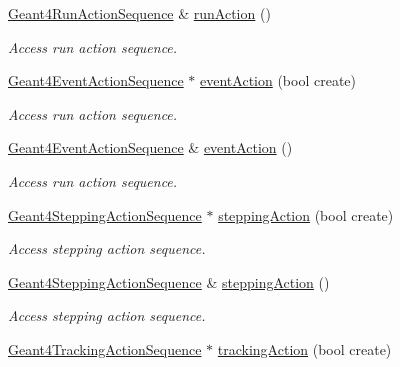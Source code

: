 \begin{DoxyCompactItemize}
\hyperlink{class_d_d4hep_1_1_simulation_1_1_geant4_run_action_sequence}{Geant4\+Run\+Action\+Sequence} \& \hyperlink{class_d_d4hep_1_1_simulation_1_1_geant4_action_container_adff65baf436f870b8cc2e9ffd8844e7a}{run\+Action} ()
\begin{DoxyCompactList}\small\item\em Access run action sequence. \end{DoxyCompactList}\item 
\hyperlink{class_d_d4hep_1_1_simulation_1_1_geant4_event_action_sequence}{Geant4\+Event\+Action\+Sequence} $\ast$ \hyperlink{class_d_d4hep_1_1_simulation_1_1_geant4_action_container_ab195f38387e12afbfcaccee77ec67845}{event\+Action} (bool create)
\begin{DoxyCompactList}\small\item\em Access run action sequence. \end{DoxyCompactList}\item 
\hyperlink{class_d_d4hep_1_1_simulation_1_1_geant4_event_action_sequence}{Geant4\+Event\+Action\+Sequence} \& \hyperlink{class_d_d4hep_1_1_simulation_1_1_geant4_action_container_a50aa73045e0959041a1ae5c162ab840d}{event\+Action} ()
\begin{DoxyCompactList}\small\item\em Access run action sequence. \end{DoxyCompactList}\item 
\hyperlink{class_d_d4hep_1_1_simulation_1_1_geant4_stepping_action_sequence}{Geant4\+Stepping\+Action\+Sequence} $\ast$ \hyperlink{class_d_d4hep_1_1_simulation_1_1_geant4_action_container_a75a0fa686f783e175eedbd57ed3abbdc}{stepping\+Action} (bool create)
\begin{DoxyCompactList}\small\item\em Access stepping action sequence. \end{DoxyCompactList}\item 
\hyperlink{class_d_d4hep_1_1_simulation_1_1_geant4_stepping_action_sequence}{Geant4\+Stepping\+Action\+Sequence} \& \hyperlink{class_d_d4hep_1_1_simulation_1_1_geant4_action_container_aa9fd5d34c9a076788e24abd8906f6e3a}{stepping\+Action} ()
\begin{DoxyCompactList}\small\item\em Access stepping action sequence. \end{DoxyCompactList}\item 
\hyperlink{class_d_d4hep_1_1_simulation_1_1_geant4_tracking_action_sequence}{Geant4\+Tracking\+Action\+Sequence} $\ast$ \hyperlink{class_d_d4hep_1_1_simulation_1_1_geant4_action_container_a4ff088a46753f37dadc07e22a0436382}{tracking\+Action} (bool create)

\end{DoxyCompactItemize}
